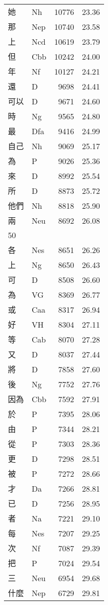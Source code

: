 \documentclass[twocolumn]{book}
\begin{document}
\begin{supertabular}{llrr}
她 & Nh & 10776 &  23.36\\
那 & Nep & 10740 &  23.58\\
上 & Ncd & 10619 &  23.79\\
但 & Cbb & 10242 &  24.00\\
年 & Nf & 10127 &  24.21\\
還 & D & 9698 &  24.41\\
可以 & D & 9671 &  24.60\\
時 & Ng & 9565 &  24.80\\
最 & Dfa & 9416 &  24.99\\
自己 & Nh & 9069 &  25.17\\
為 & P & 9026 &  25.36\\
來 & D & 8992 &  25.54\\
所 & D & 8873 &  25.72\\
他們 & Nh & 8818 &  25.90\\
兩 & Neu & 8692 &  26.08\\
50\\
各 & Nes & 8651 &  26.26\\
上 & Ng & 8650 &  26.43\\
可 & D & 8508 &  26.60\\
為 & VG & 8369 &  26.77\\
或 & Caa & 8317 &  26.94\\
好 & VH & 8304 &  27.11\\
等 & Cab & 8070 &  27.28\\
又 & D & 8037 &  27.44\\
將 & D & 7858 &  27.60\\
後 & Ng & 7752 &  27.76\\
因為 & Cbb & 7592 &  27.91\\
於 & P & 7395 &  28.06\\
由 & P & 7344 &  28.21\\
從 & P & 7303 &  28.36\\
更 & D & 7298 &  28.51\\
被 & P & 7272 &  28.66\\
才 & Da & 7266 &  28.81\\
已 & D & 7256 &  28.95\\
者 & Na & 7221 &  29.10\\
每 & Nes & 7207 &  29.25\\
次 & Nf & 7087 &  29.39\\
把 & P & 7024 &  29.54\\
三 & Neu & 6954 &  29.68\\
什麼 & Nep & 6729 &  29.81\\

\end{supertabular}
\end{document}
